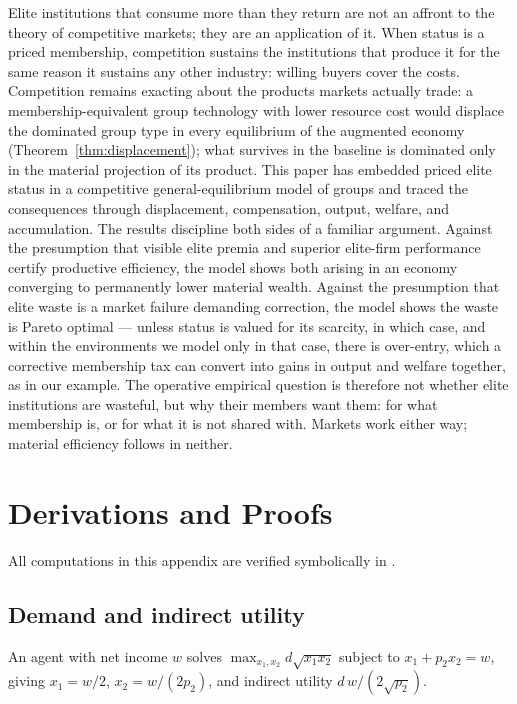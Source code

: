 \documentclass[12pt,letterpaper]{article}
\theoremstyle{definition}
\begin{document}
Elite institutions that consume more than they return are not an affront to the theory of competitive markets; they are an application of it.
When status is a priced membership, competition sustains the institutions that produce it for the same reason it sustains any other industry: willing buyers cover the costs.
Competition remains exacting about the products markets actually trade: a membership-equivalent group technology with lower resource cost would displace the dominated group type in every equilibrium of the augmented economy (Theorem~\ref{thm:displacement}); what survives in the baseline is dominated only in the material projection of its product.
This paper has embedded priced elite status in a competitive general-equilibrium model of groups and traced the consequences through displacement, compensation, output, welfare, and accumulation.
The results discipline both sides of a familiar argument.
Against the presumption that visible elite premia and superior elite-firm performance certify productive efficiency, the model shows both arising in an economy converging to permanently lower material wealth.
Against the presumption that elite waste is a market failure demanding correction, the model shows the waste is Pareto optimal --- unless status is valued for its scarcity, in which case, and within the environments we model only in that case, there is over-entry, which a corrective membership tax can convert into gains in output and welfare together, as in our example.
The operative empirical question is therefore not whether elite institutions are wasteful, but why their members want them: for what membership is, or for what it is not shared with.
Markets work either way; material efficiency follows in neither.

\appendix

\section{Derivations and Proofs}\label{app:derivations}

All computations in this appendix are verified symbolically in
.

\subsection{Demand and indirect utility}
An agent with net income $w$ solves $\max_{x_1,x_2} d\sqrt{x_1x_2}$ subject to $x_1+p_2x_2=w$, giving $x_1=w/2$, $x_2=w/(2p_2)$, and indirect utility $d\,w/(2\sqrt{p_2})$.
\end{document}
